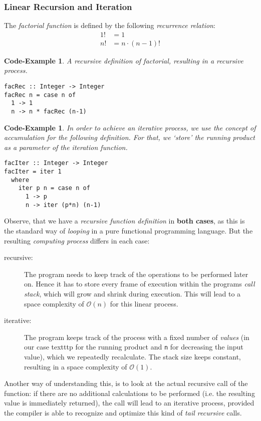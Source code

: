 \documentclass{scrartcl}
\newtheorem{impl}[defn]{Code-Example}
\numberwithin{equation}{section}
\begin{document}
\subsubsection{Linear Recursion and Iteration}

The \emph{factorial function} is defined by the following \emph{recurrence relation}:
\begin{align*}
    1! &= 1 \\ n! &= n \cdot (n-1)!
\end{align*}

\begin{impl}
A recursive definition of factorial, resulting in a recursive process.
\end{impl}

\begin{verbatim}
facRec :: Integer -> Integer
facRec n = case n of
  1 -> 1
  n -> n * facRec (n-1)
\end{verbatim}

\begin{impl}
In order to achieve an iterative process, we use the concept of accumulation for the following definition. For that, we `store' the running product as a parameter of the iteration function.
\end{impl}

\begin{verbatim}
facIter :: Integer -> Integer
facIter = iter 1
  where
    iter p n = case n of
      1 -> p
      n -> iter (p*n) (n-1)
\end{verbatim}

Observe, that we have a \emph{recursive function definition} in \textbf{both cases}, as this is the standard way of \emph{looping} in a pure functional programming language.
But the resulting \emph{computing process} differs in each case:
\begin{description}
\item[recursive:]
The program needs to keep track of the operations to be performed later on. Hence it has to store every frame of execution within the programs \emph{call stack}, which will grow and shrink during execution. This will lead to a space complexity of $\mathcal{O}(n)$ for this linear process.
\item[iterative:]
The program keeps track of the process with a fixed number of \emph{values} (in our case texttt{p} for the running product and \texttt{n} for decreasing the input value), which we repeatedly recalculate. The stack size keeps constant, resulting in a space complexity of $\mathcal{O}(1)$.
\end{description}
Another way of understanding this, is to look at the actual recursive call of the function:
if there are no additional calculations to be performed (i.e. the resulting value is immediately returned), the call will lead to an iterative process, provided the compiler is able to recognize and optimize this kind of \emph{tail recursive} calls.
\end{document}
